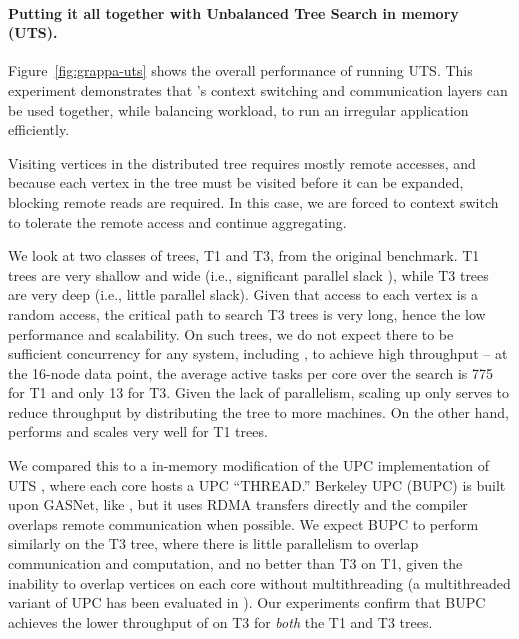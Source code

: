 
\paragraph{Putting it all together with Unbalanced Tree Search in memory
(UTS).} 
Figure~\ref{fig:grappa-uts} shows the overall performance of \Grappa running
UTS. This experiment demonstrates that \Grappa's context
switching and communication layers can be used together, while
balancing workload, to run an irregular application efficiently. 

Visiting vertices in the distributed tree requires mostly remote
accesses, and because each vertex in the tree must be visited before
it can be expanded, blocking remote reads are required. In this case,
we are forced to context switch to tolerate the remote access and
continue aggregating.

We look at two classes of trees, T1 and T3, from
the original benchmark. T1 trees are very shallow and wide (i.e., significant
parallel slack \cite{Valiant:1990}), while T3 trees are very deep (i.e., little parallel slack).
Given that access to each vertex is a random access, the critical path to search
T3 trees is very long, hence the low performance and scalability. On such
trees, we do not expect there to be sufficient concurrency for any system,
including \Grappa, to achieve high throughput -- at the 16-node data point,
the average active tasks per core over the search is 775 for T1 and
only 13 for T3. Given the lack of parallelism, scaling up only serves
to reduce throughput by distributing the tree to more machines.
On the other hand, \Grappa performs and scales very well for T1
trees.

We compared this to a in-memory modification of the UPC implementation
of UTS \cite{UTS}, where each core hosts a UPC ``THREAD.'' Berkeley
UPC (BUPC) is built upon GASNet, like \Grappa, but it uses RDMA transfers directly
and the compiler overlaps remote communication when possible. We expect BUPC to
perform similarly on the T3 tree, where there is little parallelism to
overlap communication and computation, and no better than T3 on T1,
given the inability to overlap vertices on each core without
multithreading (a multithreaded variant of UPC has been evaluated in
\cite{HotSLAW}). Our experiments confirm that BUPC achieves the lower throughput of
\Grappa on T3 for \emph{both} the T1 and T3 trees. 

